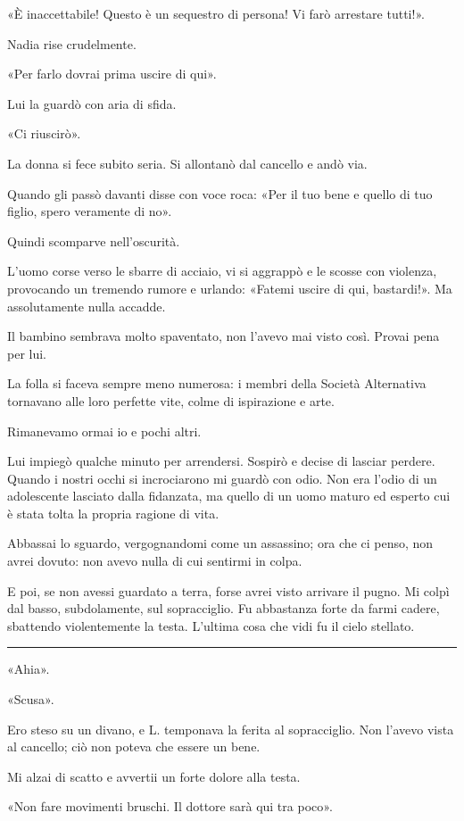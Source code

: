 \documentclass[a4paper,10pt]{memoir}
\begin{document}
«È inaccettabile! Questo è un sequestro di persona! Vi farò arrestare tutti!».

Nadia rise crudelmente.

«Per farlo dovrai prima uscire di qui».

Lui la guardò con aria di sfida.

«Ci riuscirò».

La donna si fece subito seria. Si allontanò dal cancello e andò via.

Quando gli passò davanti disse con voce roca: «Per il tuo bene e quello di tuo figlio, spero veramente di no».

Quindi scomparve nell'oscurità.

L'uomo corse verso le sbarre di acciaio, vi si aggrappò e le scosse con violenza, provocando un tremendo rumore e
urlando: «Fatemi uscire di qui, bastardi!». Ma assolutamente nulla accadde.

Il bambino sembrava molto spaventato, non l'avevo mai visto così. Provai pena per lui.

La folla si faceva sempre meno numerosa: i membri della Società Alternativa tornavano alle loro perfette vite, colme di
ispirazione e arte.

Rimanevamo ormai io e pochi altri.

Lui impiegò qualche minuto per arrendersi. Sospirò e decise di lasciar perdere. Quando i nostri occhi si incrociarono mi
guardò con odio. Non era l'odio di un adolescente lasciato dalla fidanzata, ma quello di un uomo maturo ed esperto cui è
stata tolta la propria ragione di vita.

Abbassai lo sguardo, vergognandomi come un assassino; ora che ci penso, non avrei dovuto: non avevo nulla di cui
sentirmi in colpa.

E poi, se non avessi guardato a terra, forse avrei visto arrivare il pugno. Mi colpì dal basso, subdolamente, sul
sopracciglio. Fu abbastanza forte da farmi cadere, sbattendo violentemente la testa. L'ultima cosa che vidi fu il cielo
stellato.

\plainbreak{1}

«Ahia».

«Scusa».

Ero steso su un divano, e L. temponava la ferita al sopracciglio. Non l'avevo vista al cancello; ciò non poteva che
essere un bene.

Mi alzai di scatto e avvertii un forte dolore alla testa.

«Non fare movimenti bruschi. Il dottore sarà qui tra poco».
\end{document}
